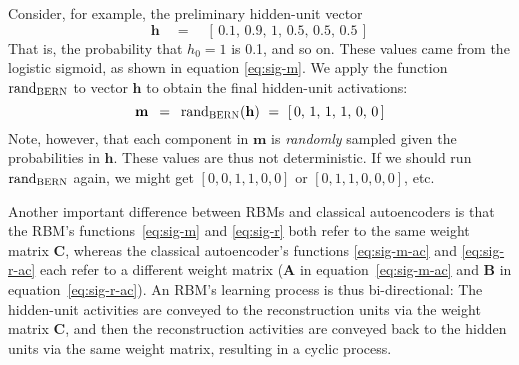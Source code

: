 Consider, for example, the preliminary hidden-unit vector 
\begin{equation}
\mathbf{h} \quad = \quad [ \,  0.1,  \,  0.9,  \,  1 ,  \,  0.5, \,  0.5,  \,  0.5  \, ]
\end{equation}
That is, the probability that $h_0 = 1$ is 0.1, and so on. 
These values came from the logistic sigmoid, as shown in equation \eqref{eq:sig-m}.
We apply the function $\text{rand}_{\textsc{BERN}}$ to vector $\mathbf{h}$ to obtain the final hidden-unit activations:
\begin{equation}
\mathbf{m} \,\,\, =  \,\,\,   \text{rand}_{\textsc{BERN}}(\mathbf{h})  \,\,  =  \,\,   [ \, 0, \, 1, \, 1, \, 1, \, 0, \, 0 \,]
\end{equation}
Note, however, that each component in $\mathbf{m}$ is \emph{randomly} sampled given the probabilities in 
$\mathbf{h}$. These values are thus not deterministic.
If we should run $\text{rand}_{\textsc{BERN}}$ again, we might get $[0, 0, 1, 1, 0, 0]$ or $[0, 1, 1, 0, 0, 0]$, etc.  %


Another important difference between
RBMs and classical autoencoders is that the RBM's functions~\eqref{eq:sig-m} and \eqref{eq:sig-r} 
both refer to the same weight matrix $\textbf{C}$, whereas the classical 
autoencoder's  functions \eqref{eq:sig-m-ac} and \eqref{eq:sig-r-ac} each 
refer to a different weight matrix 
($\textbf{A}$ in equation~\eqref{eq:sig-m-ac} and $\textbf{B}$ in equation~\eqref{eq:sig-r-ac}). 
An RBM's learning process is thus bi-directional: 
The hidden-unit activities are conveyed to the reconstruction 
units via the weight matrix $\textbf{C}$, and then the reconstruction 
activities are conveyed back to the hidden units via the same weight matrix, resulting in a cyclic process.
 
